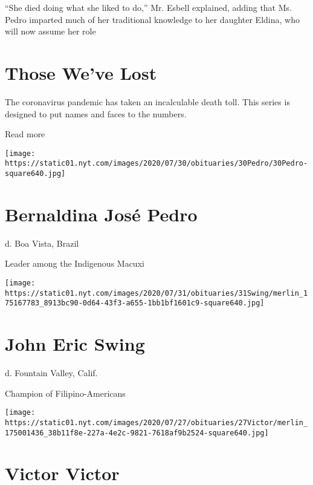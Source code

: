 ``She died doing what she liked to do,'' Mr. Esbell explained, adding
that Ms. Pedro imparted much of her traditional knowledge to her
daughter Eldina, who will now assume her role

\href{https://www.nytimes.com/interactive/2020/obituaries/people-died-coronavirus-obituaries.html?action=click\&pgtype=Article\&state=default\&region=BELOW_MAIN_CONTENT\&context=covid_obits_promo}{}

\hypertarget{those-weve-lost}{%
\section{Those We've Lost}\label{those-weve-lost}}

The coronavirus pandemic has taken an incalculable death toll. This
series is designed to put names and faces to the numbers.

Read more

\texttt{[image: https://static01.nyt.com/images/2020/07/30/obituaries/30Pedro/30Pedro-square640.jpg]}

\hypertarget{bernaldina-josuxe9-pedro}{%
\section{Bernaldina José Pedro}\label{bernaldina-josuxe9-pedro}}

d. Boa Vista, Brazil

Leader among the Indigenous Macuxi

\texttt{[image: https://static01.nyt.com/images/2020/07/31/obituaries/31Swing/merlin\_175167783\_8913bc90-0d64-43f3-a655-1bb1bf1601c9-square640.jpg]}

\hypertarget{john-eric-swing}{%
\section{John Eric Swing}\label{john-eric-swing}}

d. Fountain Valley, Calif.

Champion of Filipino-Americans

\texttt{[image: https://static01.nyt.com/images/2020/07/27/obituaries/27Victor/merlin\_175001436\_38b11f8e-227a-4e2c-9821-7618af9b2524-square640.jpg]}

\hypertarget{victor-victor}{%
\section{Victor Victor}\label{victor-victor}}

